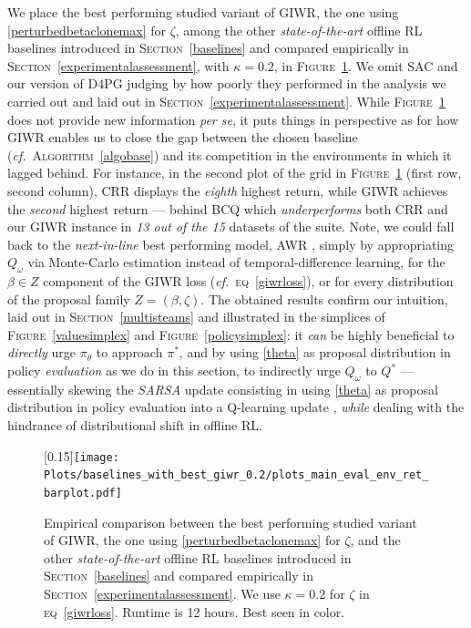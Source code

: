 We place the best performing studied variant of GIWR, the one using \ref{perturbedbetaclonemax} for $\zeta$,
among the other \textit{state-of-the-art} offline RL baselines introduced in \textsc{Section}~\ref{baselines}
and compared empirically in \textsc{Section}~\ref{experimentalassessment},
with $\kappa = 0.2$, in \textsc{Figure}~\ref{giwrbaselines:barplot}.
We omit SAC \cite{Haarnoja2018-bm}
and our version of D4PG \cite{Barth-Maron2018-ot}
judging by how poorly they performed in the analysis we carried out
and laid out in \textsc{Section}~\ref{experimentalassessment}.
While \textsc{Figure}~\ref{giwrbaselines:barplot} does not provide new information \textit{per se},
it puts things in perspective as for how GIWR enables us to close the gap between
the chosen baseline (\textit{cf.}~\textsc{Algorithm}~\ref{algobase})
and its competition in the environments in which it lagged behind.
For instance, in the second plot of the grid in \textsc{Figure}~\ref{giwrbaselines:barplot}
(first row, second column), CRR displays the \emph{eighth} highest return,
while GIWR achieves the \emph{second} highest return --- behind BCQ \cite{Fujimoto2018-mj}
which \emph{underperforms} both CRR and our GIWR instance in \emph{13 out of the 15} datasets of the suite.
Note, we could fall back to the \textit{next-in-line} best performing model, AWR \cite{Peng2019-hu},
simply by appropriating $Q_\omega$ via Monte-Carlo estimation instead of temporal-difference learning,
for the $\beta \in Z$ component of the GIWR loss (\textit{cf.}~\textsc{eq}~\ref{giwrloss}),
or for every distribution of the proposal family $Z = (\beta,\zeta)$.
The obtained results confirm our intuition, laid out in \textsc{Section}~\ref{multisteams} and illustrated in
the simplices of
\textsc{Figure}~\ref{valuesimplex} and \textsc{Figure}~\ref{policysimplex}:
it \emph{can} be highly beneficial to \emph{directly} urge $\pi_\theta$ to approach $\pi^*$, and by using \ref{theta}
as proposal distribution in policy \emph{evaluation} as we do in this section,
to indirectly urge $Q_\omega$ to $Q^*$ --- essentially skewing the \textit{SARSA} update
\cite{Rummery1994-qp, Thrun1995-sz, Sutton1996-ky, Van_Seijen2009-yw}
consisting in using \ref{theta} as proposal distribution in policy evaluation
into a Q-learning update \cite{Watkins1989-ir, Watkins1992-gl},
\emph{while} dealing with the hindrance of distributional shift in offline RL.

\begin{figure}[!h]
  \center\scalebox{0.15}[0.15]{\texttt{[image: Plots/baselines\_with\_best\_giwr\_0.2/plots\_main\_eval\_env\_ret\_barplot.pdf]}}
  \caption{Empirical comparison between the best performing studied variant of GIWR,
  the one using \ref{perturbedbetaclonemax} for $\zeta$,
  and the other \textit{state-of-the-art} offline RL baselines introduced in \textsc{Section}~\ref{baselines}
  and compared empirically in \textsc{Section}~\ref{experimentalassessment}.
  We use $\kappa=0.2$ for $\zeta$
  in \textsc{eq}~\ref{giwrloss}.
  Runtime is 12 hours. Best seen in color.}
  \label{giwrbaselines:barplot}
\end{figure}

